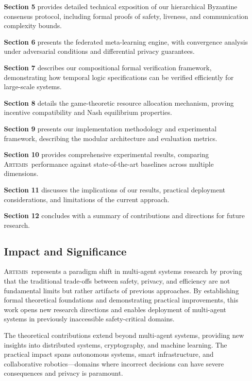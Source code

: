 \documentclass[conference]{IEEEtran}
\newcommand{\artemis}{\textsc{Artemis}}
\begin{document}
\textbf{Section 5} provides detailed technical exposition of our hierarchical Byzantine consensus protocol, including formal proofs of safety, liveness, and communication complexity bounds.

\textbf{Section 6} presents the federated meta-learning engine, with convergence analysis under adversarial conditions and differential privacy guarantees.

\textbf{Section 7} describes our compositional formal verification framework, demonstrating how temporal logic specifications can be verified efficiently for large-scale systems.

\textbf{Section 8} details the game-theoretic resource allocation mechanism, proving incentive compatibility and Nash equilibrium properties.

\textbf{Section 9} presents our implementation methodology and experimental framework, describing the modular architecture and evaluation metrics.

\textbf{Section 10} provides comprehensive experimental results, comparing \artemis\ performance against state-of-the-art baselines across multiple dimensions.

\textbf{Section 11} discusses the implications of our results, practical deployment considerations, and limitations of the current approach.

\textbf{Section 12} concludes with a summary of contributions and directions for future research.

\subsection{Impact and Significance}

\artemis\ represents a paradigm shift in multi-agent systems research by proving that the traditional trade-offs between safety, privacy, and efficiency are not fundamental limits but rather artifacts of previous approaches. By establishing formal theoretical foundations and demonstrating practical improvements, this work opens new research directions and enables deployment of multi-agent systems in previously inaccessible safety-critical domains.

The theoretical contributions extend beyond multi-agent systems, providing new insights into distributed systems, cryptography, and machine learning. The practical impact spans autonomous systems, smart infrastructure, and collaborative robotics—domains where incorrect decisions can have severe consequences and privacy is paramount.
\end{document}
